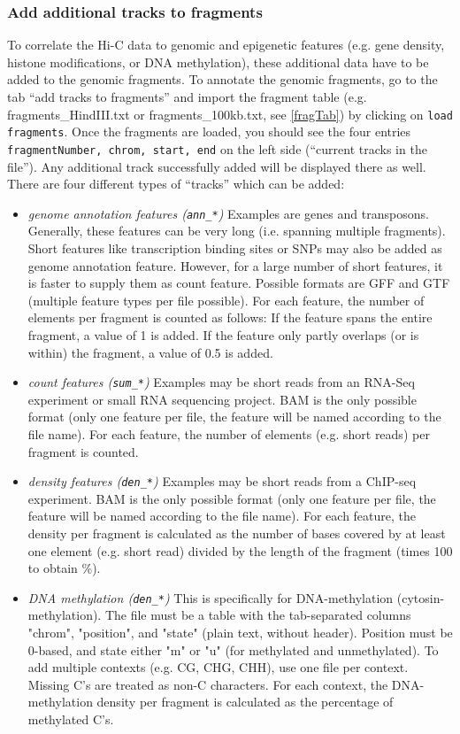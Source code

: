 \documentclass[a4paper,10pt]{article}
\begin{document}
\subsubsection{Add additional tracks to fragments}\label{HiCdat}
To correlate the Hi-C data to genomic and epigenetic features (e.g. gene density, histone modifications, or DNA methylation), these additional data have to be added to the genomic fragments. To annotate the genomic fragments, go to the tab ``add tracks to fragments'' and import the fragment table (e.g. fragments\_HindIII.txt or fragments\_100kb.txt, see \ref{fragTab}) by clicking on \texttt{load fragments}. Once the fragments are loaded, you should see the four entries \texttt{fragmentNumber, chrom, start, end} on the left side (``current tracks in the file''). Any additional track successfully added will be displayed there as well. There are four different types of ``tracks'' which can be added:
\begin{itemize}
 \item \textit{genome annotation features (\texttt{ann\_*})} \newline
Examples are genes and transposons. Generally, these features can be very long (i.e. spanning multiple fragments). Short features like transcription binding sites or SNPs may also be added as genome annotation feature. However, for a large number of short features, it is faster to supply them as count feature. Possible formats are GFF and GTF (multiple feature types per file possible). For each feature, the number of elements per fragment is counted as follows: If the feature spans the entire fragment, a value of 1 is added. If the feature only partly overlaps (or is within) the fragment, a value of 0.5 is added.
 \item \textit{count features (\texttt{sum\_*})} \newline
Examples may be short reads from an RNA-Seq experiment or small RNA sequencing project. BAM is the only possible format (only one feature per file, the feature will be named according to the file name). For each feature, the number of elements (e.g. short reads) per fragment is counted.
 \item \textit{density features (\texttt{den\_*})} \newline
Examples may be short reads from a ChIP-seq experiment. BAM is the only possible format (only one feature per file, the feature will be named according to the file name). For each feature, the density per fragment is calculated as the number of bases covered by at least one element (e.g. short read) divided by the length of the fragment (times 100 to obtain \%).
 \item \textit{DNA methylation (\texttt{den\_*})} \newline
This is specifically for DNA-methylation (cytosin-methylation). The file must be a table with the tab-separated columns "chrom", "position", and "state" (plain text, without header). Position must be 0-based, and state either "m" or "u" (for methylated and unmethylated). To add multiple contexts (e.g. CG, CHG, CHH), use one file per context. Missing C's are treated as non-C characters. For each context, the DNA-methylation density per fragment is calculated as the percentage of methylated C's.
\end{itemize}
\end{document}
